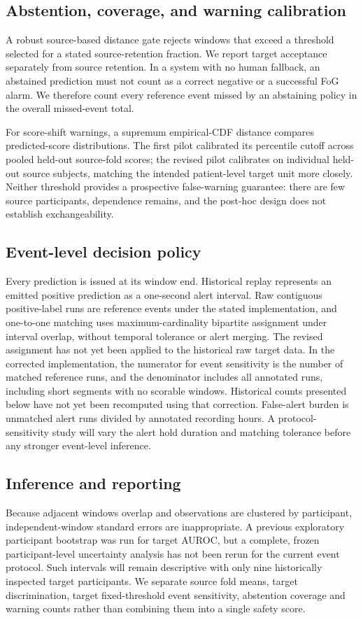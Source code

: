 \documentclass[sigconf,review,anonymous]{acmart}
\begin{document}
\subsection{Abstention, coverage, and warning calibration}
A robust source-based distance gate rejects windows that exceed a threshold selected for a stated source-retention fraction. We report target acceptance separately from source retention. In a system with no human fallback, an abstained prediction must not count as a correct negative or a successful FoG alarm. We therefore count every reference event missed by an abstaining policy in the overall missed-event total.

For score-shift warnings, a supremum empirical-CDF distance compares predicted-score distributions. The first pilot calibrated its percentile cutoff across pooled held-out source-fold scores; the revised pilot calibrates on individual held-out source subjects, matching the intended patient-level target unit more closely. Neither threshold provides a prospective false-warning guarantee: there are few source participants, dependence remains, and the post-hoc design does not establish exchangeability.

\subsection{Event-level decision policy}
Every prediction is issued at its window end. Historical replay represents an emitted positive prediction as a one-second alert interval. Raw contiguous positive-label runs are reference events under the stated implementation, and one-to-one matching uses maximum-cardinality bipartite assignment under interval overlap, without temporal tolerance or alert merging. The revised assignment has not yet been applied to the historical raw target data. In the corrected implementation, the numerator for event sensitivity is the number of matched reference runs, and the denominator includes all annotated runs, including short segments with no scorable windows. Historical counts presented below have not yet been recomputed using that correction. False-alert burden is unmatched alert runs divided by annotated recording hours. A protocol-sensitivity study will vary the alert hold duration and matching tolerance before any stronger event-level inference.

\subsection{Inference and reporting}
Because adjacent windows overlap and observations are clustered by participant, independent-window standard errors are inappropriate. A previous exploratory participant bootstrap was run for target AUROC, but a complete, frozen participant-level uncertainty analysis has not been rerun for the current event protocol. Such intervals will remain descriptive with only nine historically inspected target participants. We separate source fold means, target discrimination, target fixed-threshold event sensitivity, abstention coverage and warning counts rather than combining them into a single safety score.
\end{document}
